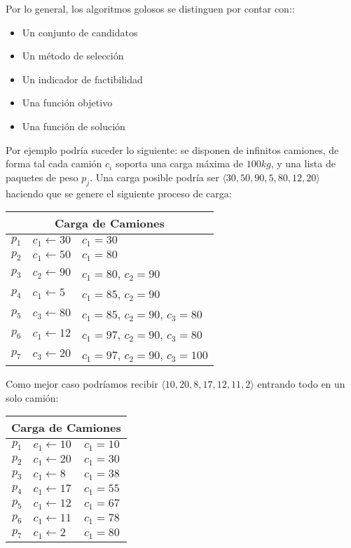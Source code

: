 \documentclass[11pt, a4paper, twoside]{article}
\begin{document}
Por lo general, los algoritmos golosos se distinguen por contar con::

\begin{itemize}
	\item Un conjunto de candidatos
	\item Un método de selección
	\item Un indicador de factibilidad
	\item Una función objetivo
	\item Una función de solución
\end{itemize}

Por ejemplo podría suceder lo siguiente: se disponen de infinitos camiones, de forma tal cada camión $c_{i}$
soporta una carga máxima de $100kg$, y una lista de paquetes de peso $p_{j}$. Una carga posible podría ser
$\langle 30, 50, 90, 5, 80, 12, 20 \rangle$ haciendo que se genere el siguiente proceso de carga:
\begin{center}
	\begin{tabular}{ | r | l | l | }
		\hline
		\multicolumn{3}{|c|}{\textbf{Carga de Camiones}} \\
		\hline
		$p_{1}$ & $c_1 \gets 30$ & $c_{1}=30$ \\
		$p_{2}$ & $c_1 \gets 50$ & $c_{1}=80$ \\
		$p_{3}$ & $c_2 \gets 90$ & $c_{1}=80$, $c_{2}=90$ \\
		$p_{4}$ & $c_1 \gets 5$  & $c_{1}=85$, $c_{2}=90$ \\
		$p_{5}$ & $c_3 \gets 80$ & $c_{1}=85$, $c_{2}=90$, $c_{3}=80$ \\
		$p_{6}$ & $c_1 \gets 12$ & $c_{1}=97$, $c_{2}=90$, $c_{3}=80$ \\
		$p_{7}$ & $c_3 \gets 20$ & $c_{1}=97$, $c_{2}=90$, $c_{3}=100$ \\
		\hline
	\end{tabular}
\end{center}

Como mejor caso podríamos recibir $\langle 10, 20, 8, 17, 12, 11, 2 \rangle$
entrando todo en un solo camión:
\begin{center}
	\begin{tabular}{ | r | l | l | }
		\hline
		\multicolumn{3}{|c|}{\textbf{Carga de Camiones}} \\
		\hline
		$p_{1}$ & $c_1 \gets 10$ & $c_{1}=10$ \\
		$p_{2}$ & $c_1 \gets 20$ & $c_{1}=30$ \\
		$p_{3}$ & $c_1 \gets  8$ & $c_{1}=38$ \\
		$p_{4}$ & $c_1 \gets 17$ & $c_{1}=55$ \\
		$p_{5}$ & $c_1 \gets 12$ & $c_{1}=67$ \\
		$p_{6}$ & $c_1 \gets 11$ & $c_{1}=78$ \\
		$p_{7}$ & $c_1 \gets  2$ & $c_{1}=80$ \\
		\hline
	\end{tabular}
\end{center}
\end{document}

